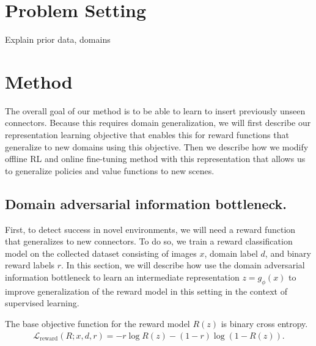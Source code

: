 \documentclass[letterpaper, 10 pt, conference, final]{ieeeconf}   %
\begin{document}



\section{Problem Setting}

Explain prior data, domains

\section{Method}

The overall goal of our method is to be able to learn to insert previously unseen connectors. Because this requires domain generalization, we will first describe our representation learning objective that enables this for reward functions that generalize to new domains using this objective. Then we describe how we modify offline RL and online fine-tuning method with this representation that allows us to generalize policies and value functions to new scenes.

\subsection{Domain adversarial information bottleneck.}
\label{sec:reward}

First, to detect success in novel environments, we will need a reward function that generalizes to new connectors. To do so, we train a reward classification model on the collected dataset consisting of images $x$, domain label $d$, and binary reward labels $r$. In this section, we will describe how use the domain adversarial information bottleneck to learn an intermediate representation $z=g_\phi(x)$ to improve generalization of the reward model in this setting in the context of supervised learning.

The base objective function for the reward model $R(z)$ is binary cross entropy. 
\begin{eqnarray}
\mathcal{L}_\text{reward}(R; x, d, r) = -r\log R(z) - (1-r)\log(1-R(z)).
\end{eqnarray}
\end{document}
